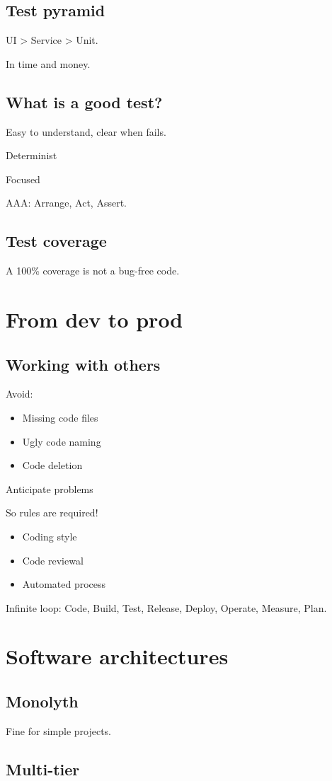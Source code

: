 \documentclass[a4paper,11pt]{article}
\newcommand{\ls}{\begin{itemize}}
\newcommand{\li}{\item}
\newcommand{\lend}{\end{itemize}}
\begin{document}
\subsection{Test pyramid}

UI > Service > Unit.

In time and money.

\subsection{What is a good test?}

Easy to understand, clear when fails.

Determinist

Focused

AAA: Arrange, Act, Assert.

\subsection{Test coverage}

A 100\% coverage is not a bug-free code.

\section{From dev to prod}

\subsection{Working with others}

Avoid:

\ls
\li Missing code files
\li Ugly code naming
\li Code deletion
\lend

Anticipate problems

So rules are required!
\ls
\li Coding style
\li Code reviewal
\li Automated process
\lend

Infinite loop: Code, Build, Test, Release, Deploy, Operate, Measure, Plan.

\section{Software architectures}

\subsection{Monolyth}

Fine for simple projects.

\subsection{Multi-tier}
\end{document}
